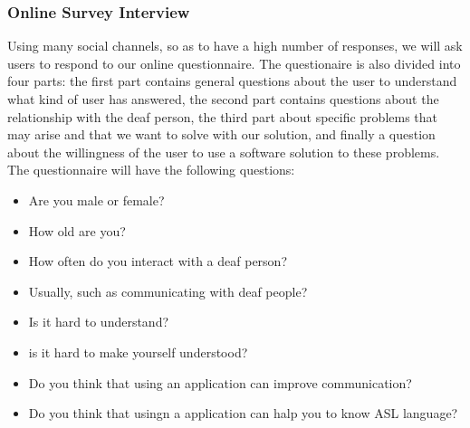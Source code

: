 \subsubsection{Online Survey Interview}
Using many social channels, so as to have a high number of responses, we will ask users to respond to our online questionnaire. The questionaire is also divided into four parts: the first part contains general questions about the user to understand what kind of user has answered, the second part contains questions about the relationship with the deaf person, the third part about specific problems that may arise and that we want to solve with our solution, and finally a question about the willingness of the user to use a software solution to these problems. The questionnaire will have the following questions:
\begin{itemize}
	\item Are you male or female?
	\item How old are you?
	\item How often do you interact with a deaf person?
	\item Usually, such as communicating with deaf people?
	\item Is it hard to understand?
	\item is it hard to make yourself understood?
	\item Do you think that using an application can improve communication?
	\item Do you think that usingn a application can halp you to know ASL language?
	
\end{itemize}
